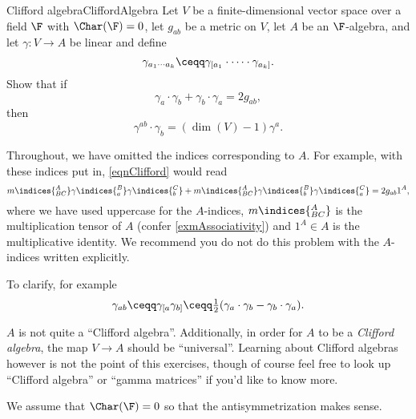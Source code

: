 \begin{exr}{Clifford algebra}{CliffordAlgebra}
	Let $V$ be a finite-dimensional vector space over a field $\F$ with $\Char (\F )=0$, let $g_{ab}$ be a metric on $V$, let $A$ be an $\F$-algebra, and let $\gamma \colon V\rightarrow A$ be linear and define
	\begin{equation}
		\gamma _{a_1\cdots a_k}\ceqq \gamma _{[a_1}\cdot \cdots \cdot \gamma _{a_k]}.
	\end{equation}
	Show that if
	\begin{equation}\label{eqnClifford}
		\gamma _a\cdot \gamma _b+\gamma _b\cdot \gamma _a=2g_{ab},
	\end{equation}
	then
	\begin{equation}
	\gamma ^{ab}\cdot \gamma _b=(\dim (V)-1)\gamma ^a.
	\end{equation}
	\begin{rmk}
		Throughout, we have omitted the indices corresponding to $A$.  For example, with these indices put in, \eqref{eqnClifford} would read
		\begin{equation}
			m\indices{^A_{BC}}\gamma \indices{^B_a}\gamma \indices{^C_b}+m\indices{^A_{BC}}\gamma \indices{^B_b}\gamma \indices{^C_a}=2g_{ab}1^A,
		\end{equation}
		where we have used uppercase for the $A$-indices, $m\indices{^A_{BC}}$ is the multiplication tensor of $A$ (confer \cref{exmAssociativity}) and $1^A\in A$ is the multiplicative identity.  We recommend you do not do this problem with the $A$-indices written explicitly.
	\end{rmk}
	\begin{rmk}
		To clarify, for example
		\begin{equation}
			\gamma _{ab}\ceqq \gamma _{[a}\gamma _{b]}\ceqq \tfrac{1}{2}(\gamma _a\cdot \gamma _b-\gamma _b\cdot \gamma _a).
		\end{equation}
	\end{rmk}
	\begin{rmk}
		$A$ is not quite a ``Clifford algebra''.  Additionally, in order for $A$ to be a \emph{Clifford algebra}, the map $V\rightarrow A$ should be ``universal''.  Learning about Clifford algebras however is not the point of this exercises, though of course feel free to look up ``Clifford algebra'' or ``gamma matrices'' if you'd like to know more.
	\end{rmk}
	\begin{rmk}
		We assume that $\Char (\F )=0$ so that the antisymmetrization makes sense.
	\end{rmk}

\end{exr}

